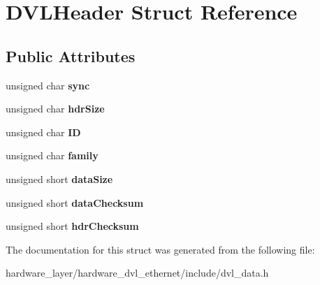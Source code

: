 \hypertarget{structDVLHeader}{}\section{D\+V\+L\+Header Struct Reference}
\label{structDVLHeader}
\subsection*{Public Attributes}
\begin{DoxyCompactItemize}
\item 
\mbox{\label{structDVLHeader_a27d0ac6baf29d0559ead2a9384b1dded}} 
unsigned char {\bfseries sync}
\item 
\mbox{\label{structDVLHeader_a2c42e3db97f1529bd582b6f7d2ce18aa}} 
unsigned char {\bfseries hdr\+Size}
\item 
\mbox{\label{structDVLHeader_af2ca0a3aad38abdb1ce53783596b9949}} 
unsigned char {\bfseries ID}
\item 
\mbox{\label{structDVLHeader_a3cb5d36f47a1a70d4ed4095ff367369f}} 
unsigned char {\bfseries family}
\item 
\mbox{\label{structDVLHeader_a9b3d0692b86e568dc9994736f5bbd000}} 
unsigned short {\bfseries data\+Size}
\item 
\mbox{\label{structDVLHeader_a7221731a16a8856930a7346e613016a4}} 
unsigned short {\bfseries data\+Checksum}
\item 
\mbox{\label{structDVLHeader_a5bb58b3b0829d51dd65833b7c6a7da77}} 
unsigned short {\bfseries hdr\+Checksum}
\end{DoxyCompactItemize}


The documentation for this struct was generated from the following file\+:\begin{DoxyCompactItemize}
\item 
hardware\+\_\+layer/hardware\+\_\+dvl\+\_\+ethernet/include/dvl\+\_\+data.\+h\end{DoxyCompactItemize}
